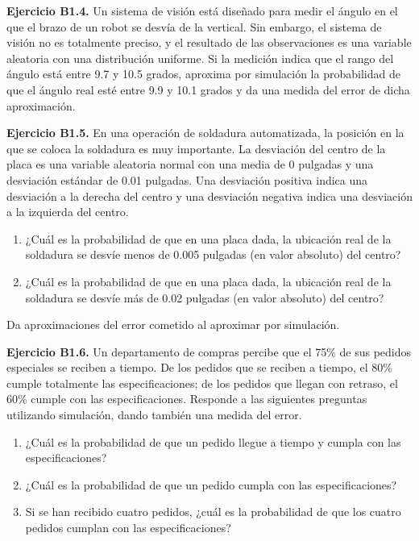 \documentclass[
]{book}
\providecommand{\tightlist}{%
  \setlength{\itemsep}{0pt}\setlength{\parskip}{0pt}}
\theoremstyle{definition}
\theoremstyle{definition}
\theoremstyle{definition}
\theoremstyle{definition}
\theoremstyle{remark}
\begin{document}
\textbf{Ejercicio B1.4.} Un sistema de visión está diseñado para medir el ángulo en el que el brazo de un robot se desvía de la vertical. Sin embargo, el sistema de visión no es totalmente preciso, y el resultado de las observaciones es una variable aleatoria con una distribución uniforme. Si la medición indica que el rango del ángulo está entre 9.7 y 10.5 grados, aproxima por simulación la probabilidad de que el ángulo real esté entre 9.9 y 10.1 grados y da una medida del error de dicha aproximación.

\textbf{Ejercicio B1.5.} En una operación de soldadura automatizada, la posición en la que se coloca la soldadura es muy importante. La desviación del centro de la placa es una variable aleatoria normal con una media de 0 pulgadas y una desviación estándar de 0.01 pulgadas. Una desviación positiva indica una desviación a la derecha del centro y una desviación negativa indica una desviación a la izquierda del centro.

\begin{enumerate}
\def\labelenumi{\arabic{enumi}.}
\tightlist
\item
  ¿Cuál es la probabilidad de que en una placa dada, la ubicación real de la soldadura se desvíe menos de 0.005 pulgadas (en valor absoluto) del centro?
\item
  ¿Cuál es la probabilidad de que en una placa dada, la ubicación real de la soldadura se desvíe más de 0.02 pulgadas (en valor absoluto) del centro?
\end{enumerate}

Da aproximaciones del error cometido al aproximar por simulación.

\textbf{Ejercicio B1.6.} Un departamento de compras percibe que el 75\% de sus pedidos especiales se reciben a tiempo. De los pedidos que se reciben a tiempo, el 80\% cumple totalmente las especificaciones; de los pedidos que llegan con retraso, el 60\% cumple con las especificaciones. Responde a las siguientes preguntas utilizando simulación, dando también una medida del error.

\begin{enumerate}
\def\labelenumi{\arabic{enumi}.}
\tightlist
\item
  ¿Cuál es la probabilidad de que un pedido llegue a tiempo y cumpla con las especificaciones?
\item
  ¿Cuál es la probabilidad de que un pedido cumpla con las especificaciones?
\item
  Si se han recibido cuatro pedidos, ¿cuál es la probabilidad de que los cuatro pedidos cumplan con las especificaciones?
\end{enumerate}
\end{document}
